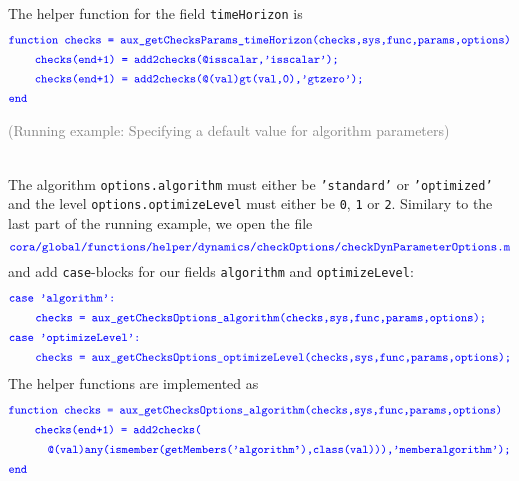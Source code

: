 \begin{tcolorbox}
	The helper function for the field \texttt{timeHorizon} is
	\begin{align*}
		&		\textcolor{blue}{\small{\texttt{function checks = aux\_getChecksParams\_timeHorizon(checks,sys,func,params,options)}}} \\
    	&\qquad \textcolor{blue}{\small{\texttt{checks(end+1) = add2checks(@isscalar,'isscalar');}}} \\
		&\qquad \textcolor{blue}{\small{\texttt{checks(end+1) = add2checks(@(val)gt(val,0),'gtzero');}}} \\
		&		\textcolor{blue}{\small{\texttt{end}}}
	\end{align*}
\end{tcolorbox}


\begin{tcolorbox}
\begin{scriptsize} \textcolor{gray}{(Running example: Specifying a default value for algorithm parameters)} \end{scriptsize} \\
The algorithm \texttt{options.algorithm} must either be \texttt{'standard'} or \texttt{'optimized'} and the level \texttt{options.optimizeLevel} must either be \texttt{0}, \texttt{1} or \texttt{2}.
Similary to the last part of the running example, we open the file
\begin{equation*}
	\textcolor{blue}{\small{\texttt{cora/global/functions/helper/dynamics/checkOptions/checkDynParameterOptions.m}}}
\end{equation*}
and add \texttt{case}-blocks for our fields \texttt{algorithm} and \texttt{optimizeLevel}:
\begin{align*}
	&		\textcolor{blue}{\small{\texttt{case 'algorithm':}}} \\
	&\qquad \textcolor{blue}{\small{\texttt{checks = aux\_getChecksOptions\_algorithm(checks,sys,func,params,options);}}} \\
	&		\textcolor{blue}{\small{\texttt{case 'optimizeLevel':}}} \\
	&\qquad \textcolor{blue}{\small{\texttt{checks = aux\_getChecksOptions\_optimizeLevel(checks,sys,func,params,options);}}}
\end{align*}
The helper functions are implemented as
\begin{align*}
	&		\textcolor{blue}{\small{\texttt{function checks = aux\_getChecksOptions\_algorithm(checks,sys,func,params,options)}}} \\
	&\qquad \textcolor{blue}{\small{\texttt{checks(end+1) = add2checks(}}} \\
	&\qquad \quad \textcolor{blue}{\small{\texttt{@(val)any(ismember(getMembers('algorithm'),class(val))),'memberalgorithm');}}} \\
	&		\textcolor{blue}{\small{\texttt{end}}}
\end{align*}

\end{tcolorbox}
